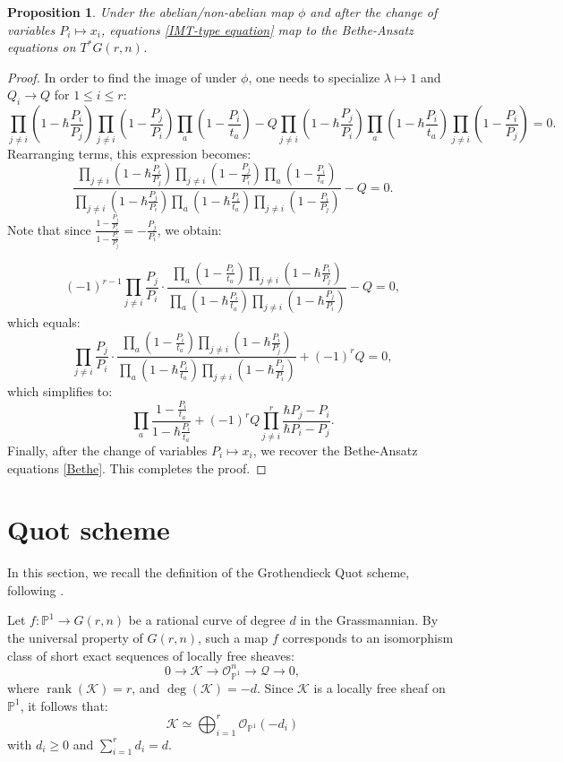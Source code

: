 \documentclass{amsart}
\newtheorem{prop}[thm]{Proposition}
\begin{document}
\begin{prop}
    Under the abelian/non-abelian map $\phi$ and after the change of variables $P_i \mapsto x_i$, equations \eqref{IMT-type equation} map to the Bethe-Ansatz equations on $T^*G(r,n)$.
\end{prop}
\begin{proof}
    In order to find the image of  under $\phi$, one needs to specialize $\lambda \mapsto 1$ and $Q_i \to Q$ for $1 \leq i \leq r$:
    \[
\prod_{j \ne i}(1- \hbar  \frac{P_i}{P_j})\prod_{j \ne i}(1-\frac{P_j}{P_i})\prod_{a}(1-\frac{P_i}{t_a}) - Q \prod_{j \ne i}(1-\hbar  \frac{P_j}{P_i})\prod_{a}(1-\hbar \frac{P_i}{t_a})\prod_{j \ne i}(1-\frac{P_i}{P_j})=0.
\]
Rearranging terms, this expression becomes:
\[
\frac{\prod_{j \ne i}(1- \hbar  \frac{P_i}{P_j})\prod_{j \ne i}(1-\frac{P_j}{P_i})\prod_{a}(1-\frac{P_i}{t_a})}{\prod_{j \ne i}(1-\hbar  \frac{P_j}{P_i})\prod_{a}(1-\hbar \frac{P_i}{t_a})\prod_{j \ne i}(1-\frac{P_i}{P_j})}-Q=0.
\]
 Note that since $\frac{1-\frac{P_j}{P_i}}{1-\frac{P_i}{P_j}} = -\frac{P_j}{P_i}$, we obtain:

 \[
 (-1)^{r-1} \prod_{j \ne i} \frac{P_j}{P_i}\cdot\frac{\prod_{a}(1-\frac{P_i}{t_a})\prod_{j \ne i}(1- \hbar  \frac{P_i}{P_j})}{\prod_{a}(1-\hbar \frac{P_i}{t_a})\prod_{j \ne i}(1-\hbar  \frac{P_j}{P_i})}-Q=0,
 \]
 which equals:
 \[
  \prod_{j \ne i} \frac{P_j}{P_i}\cdot\frac{\prod_{a}(1-\frac{P_i}{t_a})\prod_{j \ne i}(1- \hbar  \frac{P_i}{P_j})}{\prod_{a}(1-\hbar \frac{P_i}{t_a})\prod_{j \ne i}(1-\hbar  \frac{P_j}{P_i})}+ (-1)^rQ=0,
 \]
 which simplifies to: 
 \[
 \prod_a \frac{1-\frac{P_i}{t_a}}{1-\hbar\frac{P_i}{t_a}}+(-1)^r Q\prod_{j \ne i}^r \frac{\hbar P_j - P_i}{\hbar P_i - P_j}. 
 \]
 Finally, after the change of variables $P_i \mapsto x_i$, we recover the Bethe-Ansatz equations \eqref{Bethe}. This completes the proof.
\end{proof}
 
\section{Quot scheme}\label{sec:Quot scheme} In this section, we recall the definition of the
Grothendieck Quot scheme, following \cite{MR908717}. 

Let $f:\mathbb{P}^1 \to G(r,n)$ be a rational curve of degree $d$ in the Grassmannian. 
By the universal property of $G(r,n)$, such a map $f$ corresponds to an
isomorphism class of short exact sequences of locally free
sheaves:
\[
0 \to \mathcal{K} \to \mathcal{O}^n_{\mathbb{P}^1} \to \mathcal{Q} \to 0,
\]
where $\operatorname{rank}(\mathcal{K}) = r$,
 and $\deg(\mathcal{K})=-d$. Since $\mathcal{K}$ is a locally free sheaf on
$\mathbb{P}^1$, it follows that:
\[
\mathcal{K} \simeq \bigoplus_{i=1}^r \mathcal{O}_{\mathbb{P}^1}(-d_i)
\]
with $d_i \ge 0$ and $\sum_{i=1}^r d_i = d$.
\end{document}
